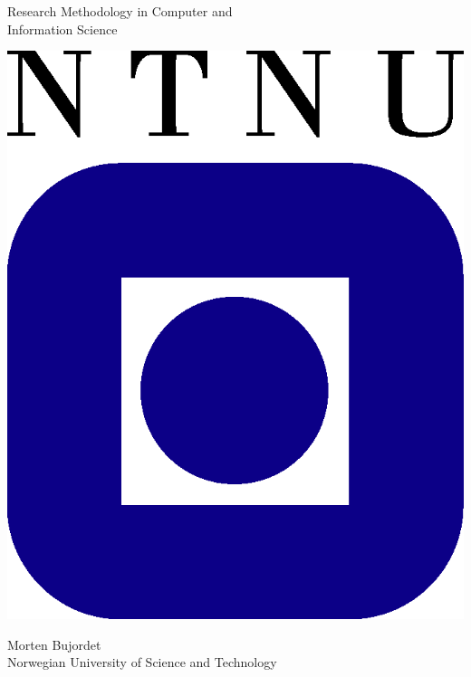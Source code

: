 \begin{titlepage}
\begin{center}

    
  {\Huge Research Methodology in Computer and}\\[0.3cm]
  {\Huge Information Science} \\


  \vspace{3.0cm}

  \includegraphics{ntnu-logo2.png}

  \vspace{4.0cm}

  {\Large Morten Bujordet} \\ [0.5cm]
  {\Large Norwegian University of Science and Technology}\\

  \vspace{4cm}

 


\end{center}
\end{titlepage}